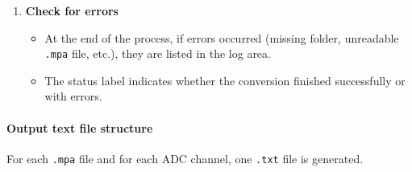 \begin{enumerate}
  \begin{itemize}
  \tightlist
  \item
    Click \textbf{convert .mpa → .txt}.\\
  \item
    The software scans the \texttt{mpafolder} corresponding to the
    selected day in the configuration file, then converts all
    \texttt{.mpa} files found in this folder.\\
  \item
    Progress is displayed in the progress bar and status label; detailed
    messages appear in the log.
  \end{itemize}
\item
  \textbf{Check for errors}

  \begin{itemize}
  \tightlist
  \item
    At the end of the process, if errors occurred (missing folder,
    unreadable \texttt{.mpa} file, etc.), they are listed in the log
    area.\\
  \item
    The status label indicates whether the conversion finished
    successfully or with errors.
  \end{itemize}
\end{enumerate}

\hypertarget{output-text-file-structure}{%
\paragraph{Output text file
structure}\label{output-text-file-structure}}

For each \texttt{.mpa} file and for each ADC channel, one \texttt{.txt}
file is generated.


